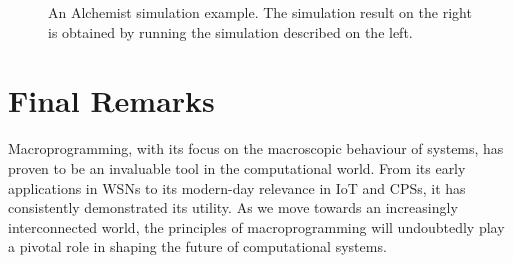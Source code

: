 \begin{figure}
\begin{subfigure}[b]{0.49\textwidth}
\end{subfigure}
\caption[An Alchemist simulation example]{An Alchemist simulation example. 
    The simulation result on the right is obtained 
    by running the simulation described on the left.
    }
\label{coordination2023:fig:alchemist}
\end{figure}

\section{Final Remarks}

Macroprogramming, with its focus on the macroscopic behaviour of systems, 
 has proven to be an invaluable tool in the computational world. 
%
From its early applications in WSNs to its modern-day relevance in IoT and CPSs, 
 it has consistently demonstrated its utility. 
As we move towards an increasingly interconnected world, 
 the principles of macroprogramming will undoubtedly play a pivotal role in shaping the future of computational systems.


